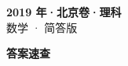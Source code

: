 \documentclass[zihao=-4, a4paper]{ctexart}
\begin{document}
\begin{center}
  {\Large\bfseries 2019 年·北京卷·理科}\\[4pt]
  {\large 数学 · 简答版}
\end{center}
\medskip
{}

\clearpage
{}
\begin{center}{\Large\bfseries 答案速查}\end{center}
\medskip

\end{document}
